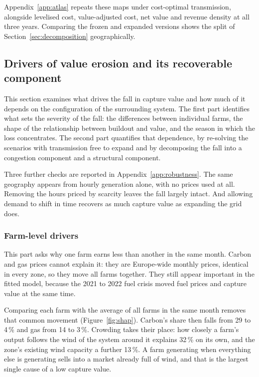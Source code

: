 Appendix~\ref{app:atlas} repeats these maps under cost-optimal transmission,
alongside levelised cost, value-adjusted cost, net value and revenue density at
all three years. Comparing the frozen and expanded versions shows the split of
Section~\ref{sec:decomposition} geographically.
\FloatBarrier


\FloatBarrier
\subsection{Drivers of value erosion and its recoverable component}\label{sec:mechanism}

This section examines what drives the fall in capture value and how much of it
depends on the configuration of the surrounding system. The first part
identifies what sets the severity of the fall: the differences between
individual farms, the shape of the relationship between buildout and value,
and the season in which the loss concentrates. The second part quantifies that
dependence, by re-solving the scenarios with transmission free to expand and
by decomposing the fall into a congestion component and a structural
component.

Three further checks are reported in Appendix~\ref{app:robustness}. The same
geography appears from hourly generation alone, with no prices used at all.
Removing the hours priced by scarcity leaves the fall largely intact. And
allowing demand to shift in time recovers as much capture value as expanding the
grid does.

\subsubsection{Farm-level drivers}\label{sec:shap_results}

This part asks why one farm earns less than another in the same month. Carbon
and gas prices cannot explain it: they are Europe-wide monthly prices, identical
in every zone, so they move all farms together. They still appear important in
the fitted model, because the 2021 to 2022 fuel crisis moved fuel prices and
capture value at the same time.

Comparing each farm with the average of all farms in the same month removes that
common movement (Figure~\ref{fig:shap}). Carbon's share then falls from 29 to
4\,\% and gas from 14 to 3\,\%. Crowding takes their place: how closely a farm's
output follows the wind of the system around it explains 32\,\% on its own, and
the zone's existing wind capacity a further 13\,\%. A farm generating when
everything else is generating sells into a market already full of wind, and that
is the largest single cause of a low capture value.

